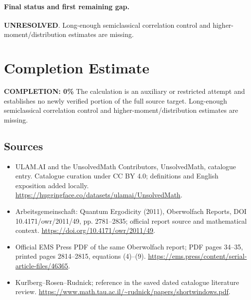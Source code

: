 \documentclass[11pt]{article}
\begin{document}
\paragraph{Final status and first remaining gap.}
\textbf{UNRESOLVED}. Long-enough semiclassical correlation control and higher-moment/distribution estimates are missing.

\section{Completion Estimate}
\noindent\textbf{COMPLETION: 0\%}
The calculation is an auxiliary or restricted attempt and establishes no newly verified portion of the full source target. Long-enough semiclassical correlation control and higher-moment/distribution estimates are missing.

\subsection{Sources}
\begin{itemize}
\item[\hypertarget{source:statement:1}{S1}] ULAM.AI and the UnsolvedMath Contributors, UnsolvedMath, catalogue entry. Catalogue curation under CC BY 4.0; definitions and English exposition added locally.
\url{https://huggingface.co/datasets/ulamai/UnsolvedMath}.
\item[\hypertarget{source:statement:2}{S2}] Arbeitsgemeinschaft: Quantum Ergodicity (2011), Oberwolfach Reports, DOI 10.4171/owr/2011/49, pp. 2781--2835; official report source and mathematical context.
\url{https://doi.org/10.4171/owr/2011/49}.
\item[\hypertarget{source:statement:3}{S3}] Official EMS Press PDF of the same Oberwolfach report; PDF pages 34--35, printed pages 2814--2815, equations (4)--(9).
\url{https://ems.press/content/serial-article-files/46365}.
\item[\hypertarget{source:statement:4}{S4}] Kurlberg--Rosen--Rudnick; reference in the saved dated catalogue literature review.
\url{https://www.math.tau.ac.il/~rudnick/papers/shortwindows.pdf}.
\end{itemize}
\label{end:statement}
\end{document}
